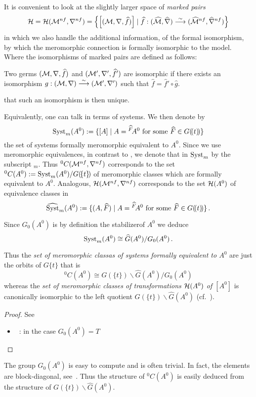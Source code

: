 It is convenient to look at the slightly larger space of \emph{marked pairs}
\[
  \mathcal{H}=\mathcal{H}(\mathcal{M}^{nf},\nabla^{nf})=\left\{
    \left[(\mathcal{M},\nabla,\widehat f)\right]
      \mid
      \widehat f:(\widehat{\mathcal{M}},\widehat\nabla)
        \overset{\sim}\longrightarrow
        (\widehat{\mathcal{M}}^{nf},\widehat\nabla^{nf})
  \right\}
\]
in which we also handle the additional information, of the formal isomorphism,
by which the meromorphic connection is formally isomorphic to the model.
Where the isomorphisms of marked pairs are defined as follows:
\begin{defn}
  Two germs $(\mathcal{M},\nabla,\widehat f)$ and $(\mathcal{M}',\nabla',\widehat f')$ are
  isomorphic if there exists an isomorphism
  $g:(\mathcal{M},\nabla)\overset{\sim}\longrightarrow(\mathcal{M}',\nabla')$ such that
  $\hat f=\hat f'\circ \hat g$.
  \begin{s-rem}
     \cite[111]{sabbah2007isomonodromic} that such
    an isomorphism is then unique.
  \end{s-rem}
\end{defn}

Equivalently, one can talk in terms of systems. We then denote by
\[
  \operatorname{Syst}_m(A^0):=\{[A]
    \mid A={}^{\widehat F}\!A^0 \text{ for some } \widehat F\in G(\!(t)\!)\}
\]
the set of systems formally meromorphic equivalent to $A^0$.
Since we use meromorphic equivalences, in contrast to \cite{boalch,thboalch},
we denote that in $\operatorname{Syst}_m$ by the subscript ${}_m$.
Thus ${}^0C(\mathcal{M}^{nf},\nabla^{nf})$ corresponds to
the set ${}^0C(A^0):=\operatorname{Syst}_m(A^0)/G(\!\{t\}\!)$ of meromorphic classes which
are formally equivalent to $A^0$.
Analogous, $\mathcal{H}(\mathcal{M}^{nf},\nabla^{nf})$ corresponds to the set $\mathcal{H}(A^0)$ of
equivalence classes in
\[
  \widehat{\operatorname{Syst}}_m(A^0):=\{(A,\widehat F)
    \mid A={}^{\widehat F}\!A^0 \text{ for some } \widehat F\in G(\!(t)\!)\} \,.
\]

\begin{lem}
  Since $G_0(A^0)$ is by definition the stabilizer\TODO[correct?] of $A^0$ we
  deduce
  \[
    \operatorname{Syst}_m(A^0)\cong \widehat G(A^0)/G_0(A^0) \,.
  \]
  \begin{s-cor}
    Thus the \emph{set of meromorphic classas of systems formally equivalent
      to $A^0$} are just the orbits of $G\{t\}$ that is
    \[
      {}^0C(A^0)\cong G(\!\{t\}\!)\backslash\hat G(A^0)/G_0(A^0)
    \]
    whereas the \emph{set of meromorphic classes of transformations $\mathcal{H}(A^0)$
    of $[A^0]$} is canonically isomorphic to the left quotient
    $G(\!\{t\}\!)\backslash\hat G(A^0)$ (cf.\ \cite[Lem.1.17]{thboalch}).
  \end{s-cor}
\end{lem}
\begin{proof}
  See
  \begin{itemize}
    \item~\cite[6]{thboalch}: in the case $G_0(A^0)=T$
  \end{itemize}
\end{proof}

The group $G_0(A^0)$ is easy to compute and is often trivial. In fact, the
elements are block-diagonal, see~\cite[77]{Loday2014}.
Thus the structure of ${}^0C(A^0)$ is easily deduced from the structure of
$G(\!\{t\}\!)\backslash\hat G(A^0)$.
